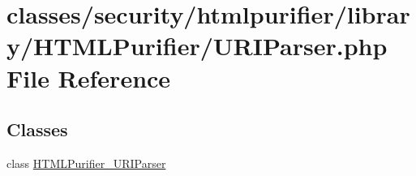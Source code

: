 \hypertarget{URIParser_8php}{\section{classes/security/htmlpurifier/library/\+H\+T\+M\+L\+Purifier/\+U\+R\+I\+Parser.php File Reference}
\label{URIParser_8php}
}
\subsection*{Classes}
\begin{DoxyCompactItemize}
\item 
class \hyperlink{classHTMLPurifier__URIParser}{H\+T\+M\+L\+Purifier\+\_\+\+U\+R\+I\+Parser}
\end{DoxyCompactItemize}
